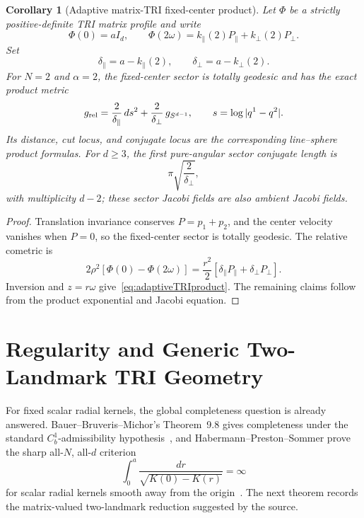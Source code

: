 \documentclass[11pt]{article}
\newtheorem{corollary}{Corollary}
\begin{document}
\begin{corollary}[Adaptive matrix-TRI fixed-center product]
\label{cor:matrixadaptive}
Let \(\Phi\) be a strictly positive-definite TRI matrix profile and write
\[
 \Phi(0)=aI_d,\qquad
 \Phi(2\omega)
 =k_\parallel(2)P_\parallel+k_\perp(2)P_\perp.
\]
Set
\[
 \delta_\parallel=a-k_\parallel(2),\qquad
 \delta_\perp=a-k_\perp(2).
\]
For \(N=2\) and \(\alpha=2\), the fixed-center sector is totally geodesic
and has the exact product metric
\begin{equation}
 g_{\rm rel}
 =\frac{2}{\delta_\parallel}\,ds^2
  +\frac{2}{\delta_\perp}\,g_{S^{d-1}},
 \qquad s=\log|q^1-q^2|.
 \label{eq:adaptiveTRIproduct}
\end{equation}
Its distance, cut locus, and conjugate locus are the corresponding
line--sphere product formulas.  For \(d\ge3\), the first pure-angular sector
conjugate length is
\[
 \pi\sqrt{\frac{2}{\delta_\perp}},
\]
with multiplicity \(d-2\); these sector Jacobi fields are also ambient
Jacobi fields.
\end{corollary}

\begin{proof}
Translation invariance conserves \(P=p_1+p_2\), and the center velocity
vanishes when \(P=0\), so the fixed-center sector is totally geodesic.
The relative cometric is
\[
 2\rho^2[\Phi(0)-\Phi(2\omega)]
 =\frac{r^2}{2}
  [\delta_\parallel P_\parallel+\delta_\perp P_\perp].
\]
Inversion and \(z=r\omega\) give~\eqref{eq:adaptiveTRIproduct}.  The
remaining claims follow from the product exponential and Jacobi equation.
\end{proof}

\section*{Regularity and Generic Two-Landmark TRI Geometry}

For fixed scalar radial kernels, the global completeness question is already
answered.  Bauer--Bruveris--Michor's Theorem~9.8 gives completeness under the
standard \(C_b^1\)-admissibility hypothesis~\cite{BBM}, and
Habermann--Preston--Sommer prove the sharp all-\(N\), all-\(d\) criterion
\[
 \int_0^a\frac{dr}{\sqrt{K(0)-K(r)}}=\infty
\]
for scalar radial kernels smooth away from the origin~\cite{HPS}.  The next
theorem records the matrix-valued two-landmark reduction suggested by the
source.
\end{document}
